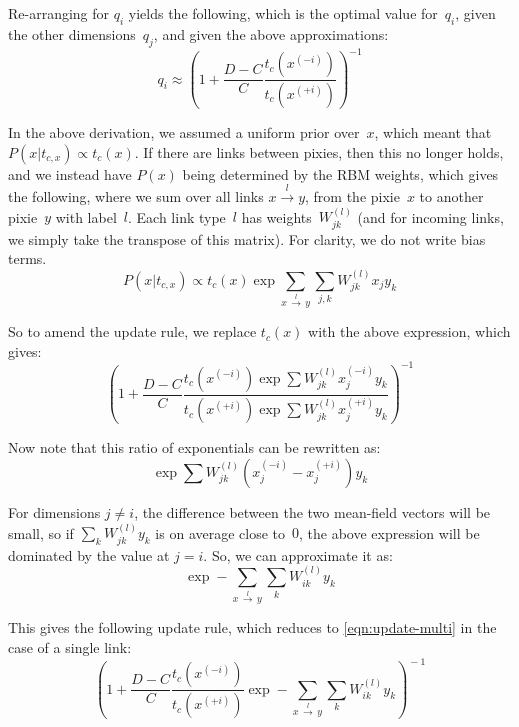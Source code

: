 \documentclass[11pt]{article}
\begin{document}
Re-arranging for $q_i$ yields the following,
which is the optimal value for~$q_i$,
given the other dimensions~$q_j$,
and given the above approximations:
\begin{equation*}
q_i \approx \left(1 + \frac{D-C}{C} \frac{t_c\left(x^{(-i)}\right)}{t_c\left(x^{(+i)}\right)} \right)^{-1}
\end{equation*}

In the above derivation,
we assumed a uniform prior over~$x$,
which meant that $P(x|t_{c,x}) \propto t_c(x)$.
If there are links between pixies,
then this no longer holds,
and we instead have $P(x)$
being determined by the RBM weights, which gives the following,
where we sum over all links $x \xrightarrow{l} y$,
from the pixie~$x$ to another pixie~$y$ with label~$l$.
Each link type~$l$ has weights~$W^{(l)}_{jk}$
(and for incoming links, we simply take the transpose of this matrix).
For clarity, we do not write bias terms.
\begin{equation*}
P(x|t_{c,x}) \propto t_c(x) \exp \!\sum_{x \, \xrightarrow{l} \, y}\! \sum_{j,k} W^{(l)}_{jk}x_j y_k
\end{equation*}

So to amend the update rule,
we replace $t_c(x)$ with the above expression, which gives:
\begin{equation*}
\left(1 + \frac{D-C}{C} \frac
{t_c\left(x^{(-i)}\right) \exp\sum W^{(l)}_{jk}x^{(-i)}_j y_k}
{t_c\left(x^{(+i)}\right) \exp\sum W^{(l)}_{jk}x^{(+i)}_j y_k}
\right)^{-1}
\end{equation*}

Now note that this ratio of exponentials can be rewritten as:
\begin{equation*}
\exp\sum W^{(l)}_{jk}\left(x^{(-i)}_j - x^{(+i)}_j\right) y_k
\end{equation*}

For dimensions $j \neq i$, the difference between the two mean-field vectors will be small,
so if $\sum_k W^{(l)}_{jk} y_k$ is on average close to~$0$,
the above expression will be dominated by the value at $j=i$.
So, we can approximate it as:
\begin{equation*}
\exp - \!\!\sum_{x \, \xrightarrow{l} \, y}\! \sum_k W^{(l)}_{ik} y_k
\end{equation*}

This gives the following update rule, which
reduces to \cref{eqn:update-multi} in the case of a single link:
\begin{equation*}
\left(1 + \frac{D\!-\!C}{C} \frac{t_c\left(x^{(-i)}\right)}{t_c\left(x^{(+i)}\right)}
\exp - \!\!\! \sum_{x \, \xrightarrow{l} \, y} \!\!\sum_k W^{(l)}_{ik} y_k
\right)^{\!\!-1}
\end{equation*}
\end{document}
